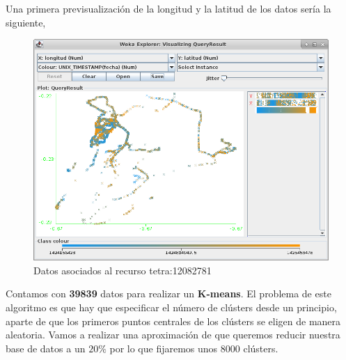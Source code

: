 \documentclass[a4paper, 12pt]{article}
\begin{document}
Una primera previsualizaci\'on de la longitud y la latitud de los datos ser\'ia la siguiente,\\

\begin{figure}[!htbp]
	\begin{center}
	\includegraphics[scale=.5]{wekaImportData.png}
	\end{center}
	\caption{Datos asociados al recurso tetra:12082781}
\end{figure}

Contamos con \textbf{39839} datos para realizar un \textbf{K-means}. El problema de este algoritmo es que hay que especificar el n\'umero de cl\'usters desde un principio, aparte de que los primeros puntos centrales de los cl\'usters se eligen de manera aleatoria. Vamos a realizar una aproximaci\'on de que queremos reducir nuestra base de datos a un $20\%$ por lo que fijaremos unos $8000$ cl\'usters. 
\end{document}
